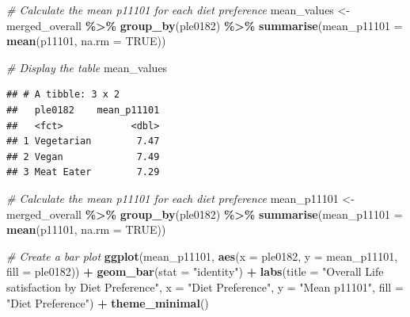 \documentclass[
]{article}
\newenvironment{Shaded}{\begin{snugshade}}{\end{snugshade}}
\newcommand{\AttributeTok}[1]{\textcolor[rgb]{0.13,0.29,0.53}{#1}}
\newcommand{\CommentTok}[1]{\textcolor[rgb]{0.56,0.35,0.01}{\textit{#1}}}
\newcommand{\ConstantTok}[1]{\textcolor[rgb]{0.56,0.35,0.01}{#1}}
\newcommand{\FunctionTok}[1]{\textcolor[rgb]{0.13,0.29,0.53}{\textbf{#1}}}
\newcommand{\NormalTok}[1]{#1}
\newcommand{\OtherTok}[1]{\textcolor[rgb]{0.56,0.35,0.01}{#1}}
\newcommand{\SpecialCharTok}[1]{\textcolor[rgb]{0.81,0.36,0.00}{\textbf{#1}}}
\newcommand{\StringTok}[1]{\textcolor[rgb]{0.31,0.60,0.02}{#1}}
\begin{document}
\begin{Shaded}
\begin{Highlighting}[]
\CommentTok{\# Calculate the mean p11101 for each diet preference}
\NormalTok{mean\_values }\OtherTok{\textless{}{-}}\NormalTok{ merged\_overall }\SpecialCharTok{\%\textgreater{}\%}
  \FunctionTok{group\_by}\NormalTok{(ple0182) }\SpecialCharTok{\%\textgreater{}\%}
  \FunctionTok{summarise}\NormalTok{(}\AttributeTok{mean\_p11101 =} \FunctionTok{mean}\NormalTok{(p11101, }\AttributeTok{na.rm =} \ConstantTok{TRUE}\NormalTok{))}

\CommentTok{\# Display the table}
\NormalTok{mean\_values}
\end{Highlighting}
\end{Shaded}

\begin{verbatim}
## # A tibble: 3 x 2
##   ple0182    mean_p11101
##   <fct>            <dbl>
## 1 Vegetarian        7.47
## 2 Vegan             7.49
## 3 Meat Eater        7.29
\end{verbatim}

\begin{Shaded}
\begin{Highlighting}[]
\CommentTok{\# Calculate the mean p11101 for each diet preference}
\NormalTok{mean\_p11101 }\OtherTok{\textless{}{-}}\NormalTok{ merged\_overall }\SpecialCharTok{\%\textgreater{}\%}
  \FunctionTok{group\_by}\NormalTok{(ple0182) }\SpecialCharTok{\%\textgreater{}\%}
  \FunctionTok{summarise}\NormalTok{(}\AttributeTok{mean\_p11101 =} \FunctionTok{mean}\NormalTok{(p11101, }\AttributeTok{na.rm =} \ConstantTok{TRUE}\NormalTok{))}

\CommentTok{\# Create a bar plot}
\FunctionTok{ggplot}\NormalTok{(mean\_p11101, }\FunctionTok{aes}\NormalTok{(}\AttributeTok{x =}\NormalTok{ ple0182, }\AttributeTok{y =}\NormalTok{ mean\_p11101, }\AttributeTok{fill =}\NormalTok{ ple0182)) }\SpecialCharTok{+}
  \FunctionTok{geom\_bar}\NormalTok{(}\AttributeTok{stat =} \StringTok{"identity"}\NormalTok{) }\SpecialCharTok{+}
  \FunctionTok{labs}\NormalTok{(}\AttributeTok{title =} \StringTok{"Overall Life satisfaction by Diet Preference"}\NormalTok{,}
       \AttributeTok{x =} \StringTok{"Diet Preference"}\NormalTok{,}
       \AttributeTok{y =} \StringTok{"Mean p11101"}\NormalTok{,}
       \AttributeTok{fill =} \StringTok{"Diet Preference"}\NormalTok{) }\SpecialCharTok{+}
  \FunctionTok{theme\_minimal}\NormalTok{()}
\end{Highlighting}
\end{Shaded}
\end{document}
